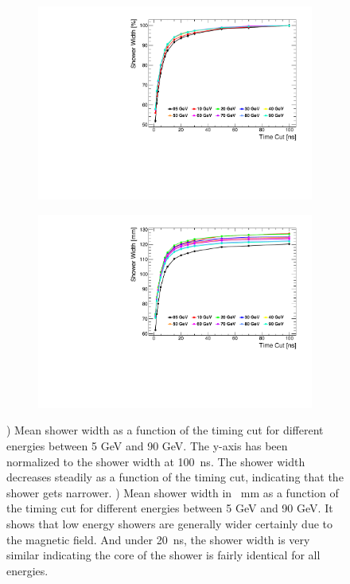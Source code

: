 \begin{figure}[htbp!]
  \centering
  \begin{subfigure}[t]{0.49\textwidth}
    \centering
    \includegraphics[width=1\linewidth]{../Thesis_Plots/ILD/NoSmearing/Plots/ShowerWidth_TimeCuts_noSmearing}
    \caption{} \label{fig:ShowerWidthNoSmearing}
  \end{subfigure}
  \begin{subfigure}[t]{0.49\textwidth}
    \centering
    \includegraphics[width=1\linewidth]{../Thesis_Plots/ILD/NoSmearing/Plots/ShowerWidthAbso_TimeCuts_noSmearing}
    \caption{} \label{fig:ShowerWidthAbsoNoSmearing}
  \end{subfigure}
  \caption{) Mean shower width as a function of the timing cut for different \kzeroL{} energies between 5 GeV and 90 GeV. The y-axis has been normalized to the shower width at \SI{100}{\nano\second}. The shower width decreases steadily as a function of the timing cut, indicating that the shower gets narrower. ) Mean shower width in \SI{}{\milli\meter} as a function of the timing cut for different \kzeroL{} energies between 5 GeV and 90 GeV. It shows that low energy showers are generally wider certainly due to the magnetic field. And under \SI{20}{\nano\second}, the shower width is very similar indicating the core of the shower is fairly identical for all energies.}
\end{figure}

